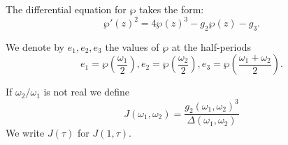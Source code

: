 \begin{definition}
    The differential equation for $\wp$ takes the form:
    \[
        \wp'(z)^2 = 4 \wp(z)^3 - g_2 \wp(z) - g_3.
    \]
\end{definition}

\begin{definition}[$e_1, e_2, e_3$]
    We denote by $e_1, e_2, e_3$ the values of $\wp$ at the half-periods
    \[
        e_1 = \wp(\frac{\omega_1}{2}), e_2 = \wp(\frac{\omega_2}{2}), e_3 = \wp(\frac{\omega_1 + \omega_2}{2}).
    \]
\end{definition}

\begin{definition}
    If $\omega_2 / \omega_1$ is not real we define
    \[
        J(\omega_1, \omega_2) = \frac{g_2(\omega_1, \omega_2)^3}{\Delta(\omega_1, \omega_2)}
    \]
    We write $J(\tau)$ for $J(1,\tau)$.
\end{definition}